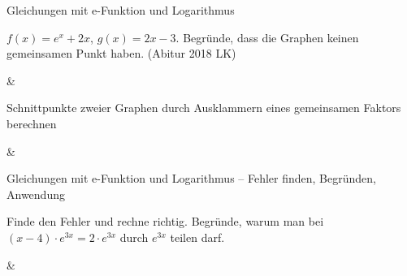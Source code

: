 \begin{aufgabe}{Gleichungen mit e-Funktion und Logarithmus}
\begin{teile}
\teil $f(x) = e^{x} + 2x$, $g(x) = 2x - 3$. Begründe, dass die Graphen keinen gemeinsamen Punkt haben. \hfill (Abitur 2018 LK)
\end{teile}
\begin{gleichungsraster}[2]
 &
 \\
\end{gleichungsraster}
\end{aufgabe}

\begin{aufgabe}{Schnittpunkte zweier Graphen durch Ausklammern eines gemeinsamen Faktors berechnen}
\begin{gleichungsraster}[2]
 & \\
\end{gleichungsraster}
\end{aufgabe}

\begin{aufgabe}{Gleichungen mit e-Funktion und Logarithmus – Fehler finden, Begründen, Anwendung}
\begin{teile}
\teil Finde den Fehler und rechne richtig. 
\teil Begründe, warum man bei $(x - 4) \cdot e^{3x} = 2 \cdot e^{3x}$ durch $e^{3x}$ teilen darf.
\end{teile}
\begin{gleichungsraster}[2]
 & \\
\end{gleichungsraster}
\end{aufgabe}
